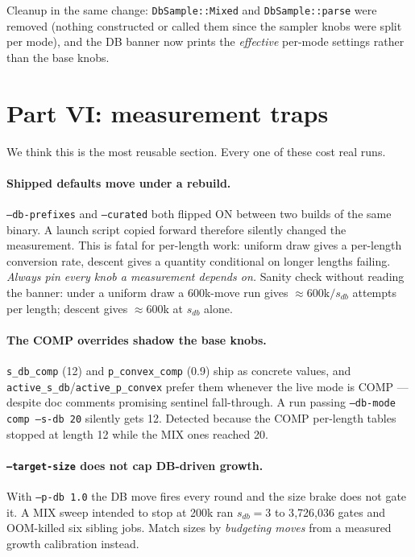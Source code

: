 \documentclass[11pt]{article}
\newcommand{\code}[1]{\texttt{#1}}
\begin{document}
Cleanup in the same change: \code{DbSample::Mixed} and \code{DbSample::parse}
were removed (nothing constructed or called them since the sampler knobs were
split per mode), and the DB banner now prints the \emph{effective} per-mode
settings rather than the base knobs.

\section{Part VI: measurement traps}

We think this is the most reusable section. Every one of these cost real runs.

\paragraph{Shipped defaults move under a rebuild.} \code{--db-prefixes} and
\code{--curated} both flipped ON between two builds of the same binary. A
launch script copied forward therefore silently changed the measurement. This
is fatal for per-length work: uniform draw gives a per-length conversion rate,
descent gives a quantity conditional on longer lengths failing. \emph{Always
pin every knob a measurement depends on.} Sanity check without reading the
banner: under a uniform draw a 600k-move run gives $\approx600\text{k}/s_{db}$
attempts per length; descent gives $\approx$600k at $s_{db}$ alone.

\paragraph{The COMP overrides shadow the base knobs.} \code{s\_db\_comp} (12)
and \code{p\_convex\_comp} (0.9) ship as concrete values, and
\code{active\_s\_db}/\code{active\_p\_convex} prefer them whenever the live mode
is COMP --- despite doc comments promising sentinel fall-through. A run passing
\code{--db-mode comp --s-db 20} silently gets 12. Detected because the COMP
per-length tables stopped at length 12 while the MIX ones reached 20.

\paragraph{\code{--target-size} does not cap DB-driven growth.} With
\code{--p-db 1.0} the DB move fires every round and the size brake does not
gate it. A MIX sweep intended to stop at 200k ran $s_{db}=3$ to 3{,}726{,}036
gates and OOM-killed six sibling jobs. Match sizes by \emph{budgeting moves}
from a measured growth calibration instead.
\end{document}
